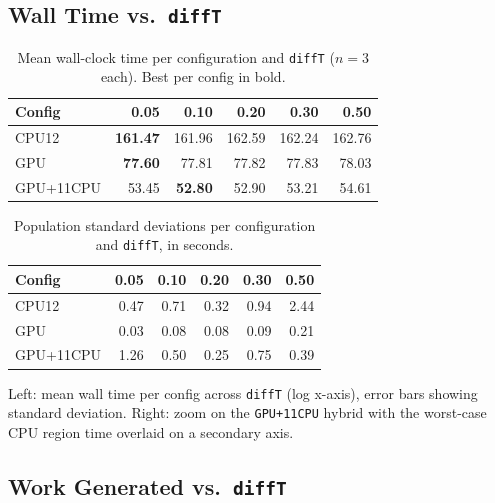 \documentclass[
	english,
	letterpaper, oneside
]{article}
\begin{document}
\subsection{Wall Time vs.\ \texttt{diffT}}

\begin{table}[H]
    \centering
    \caption{Mean wall-clock time per configuration and \texttt{diffT}
             ($n=3$ each). Best per config in bold.}
    \label{tab:wall}
    \begin{tabular}{lrrrrr}
        \hline
        \textbf{Config} & \textbf{0.05} & \textbf{0.10} & \textbf{0.20} & \textbf{0.30} & \textbf{0.50} \\
        \hline
        CPU12     & \textbf{161.47} & 161.96 & 162.59 & 162.24 & 162.76 \\
        GPU       & \textbf{77.60} & 77.81 & 77.82 & 77.83 & 78.03 \\
        GPU+11CPU & 53.45 & \textbf{52.80} & 52.90 & 53.21 & 54.61 \\
        \hline
    \end{tabular}
\end{table}

\begin{table}[H]
    \centering
    \caption{Population standard deviations per configuration and
             \texttt{diffT}, in seconds.}
    \label{tab:std}
    \begin{tabular}{lrrrrr}
        \hline
        \textbf{Config} & \textbf{0.05} & \textbf{0.10} & \textbf{0.20} & \textbf{0.30} & \textbf{0.50} \\
        \hline
        CPU12     & 0.47 & 0.71 & 0.32 & 0.94 & 2.44 \\
        GPU       & 0.03 & 0.08 & 0.08 & 0.09 & 0.21 \\
        GPU+11CPU & 1.26 & 0.50 & 0.25 & 0.75 & 0.39 \\
        \hline
    \end{tabular}
\end{table}

            {Left: mean wall time per config across \texttt{diffT} (log
             x-axis), error bars showing standard deviation. Right:
             zoom on the \texttt{GPU+11CPU} hybrid with the
             worst-case CPU region time overlaid on a secondary
             axis. \label{fig:sweep}}

\subsection{Work Generated vs.\ \texttt{diffT}}
\end{document}
